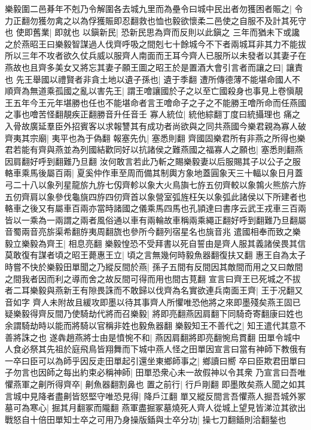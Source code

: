 樂毅圍二邑朞年不剋乃令解圍各去城九里而為壘令曰城中民出者勿獲困者賑之|{
	令力正翻勿獲勿禽之以為俘獲賑即忍翻救也恤也毅欲懷柔二邑使之自服不及計其死守也}
使即舊業|{
	即就也}
以鎭新民|{
	恐新民思為齊而反則以此鎭之}
三年而猶未下或讒之於燕昭王曰樂毅智謀過人伐齊呼吸之間剋七十餘城今不下者兩城耳非其力不能拔所以三年不攻者欲久仗兵威以服齊人南面而王耳今齊人已服所以未發者以其妻子在燕故也且齊多美女又將忘其妻子願王圖之昭王於是置酒大會引言者而讓之曰|{
	讓責也}
先王舉國以禮賢者非貪土地以遺子孫也|{
	遺于季翻}
遭所傳德薄不能堪命國人不順齊為無道乘孤國之亂以害先王|{
	謂王噲讓國於子之以至亡國殺身也事見上卷愼靚王五年今王元年堪勝也任也不能堪命者言王噲命子之子之不能勝王噲所命而任燕國之事也噲苦怪翻靚疾正翻勝音升任音壬}
寡人統位|{
	統他綜翻丁度曰統攝理也}
痛之入骨故廣延羣臣外招賓客以求報讐其有成功者尚欲與之同共燕國今樂君親為寡人破齊夷其宗廟|{
	夷平也為于偽翻}
報塞先仇|{
	塞悉則翻}
齊國固樂君所有非燕之所得也樂君若能有齊與燕並為列國結歡同好以抗諸侯之難燕國之福寡人之願也|{
	塞悉則翻燕因肩翻好呼到翻難乃旦翻}
汝何敢言若此乃斬之賜樂毅妻以后服賜其子以公子之服輅車乘馬後屬百兩|{
	夏奚仲作車至周而備其制輿方象地蓋圓象天三十輻以象日月蓋弓二十八以象列星龍旂九斿七仭齊軫以象大火鳥旟七斿五仞齊較以象鶉火熊旂六斿五仞齊肩以象參伐龜旐四斿四仞齊首以象營室弧旌枉矢以象弧此諸侯以下所建者也輅車之後又有屬車百兩亦當時諸國之儀乘馬四馬也孔頴達曰書序云武王戎車三百兩皆以一乘為一兩謂之兩者風俗通以車有兩輪故車稱兩乘繩正翻好呼到翻難乃旦翻屬音蜀兩音亮旂渠希翻斿夷周翻旒也參所今翻列宿星名也旐音兆}
遣國相奉而致之樂毅立樂毅為齊王|{
	相息亮翻}
樂毅惶恐不受拜書以死自誓由是齊人服其義諸侯畏其信莫敢復有謀者頃之昭王薨惠王立|{
	頃之言無幾何時毅魚器翻復扶又翻}
惠王自為太子時嘗不快於樂毅田單聞之乃縱反間於燕|{
	孫子五間有反間因其敵間而用之又曰敵間之間我者因而利之導而舍之故反間可得而用也間古莧翻}
宣言曰齊王已死城之不拔者二耳樂毅與燕新王有隙畏誅而不敢歸以伐齊為名實欲連兵南面王齊|{
	王于况翻又音如字}
齊人未附故且緩攻即墨以待其事齊人所懼唯恐他將之來即墨殘矣燕王固已疑樂毅得齊反間乃使騎劫代將而召樂毅|{
	將即亮翻燕因肩翻下同騎奇寄翻康曰姓也余謂騎劫時以能而將騎以官稱非姓也毅魚器翻}
樂毅知王不善代之|{
	知王遣代其意不善將誅之也}
遂犇趙燕將士由是憤惋不和|{
	燕因肩翻將即亮翻惋烏貫翻}
田單令城中人食必祭其先祖於庭飛鳥皆翔舞而下城中燕人怪之田單因宣言曰當有神師下教俄有一卒曰臣可以為師乎因反走田單起引還坐東鄉師事之|{
	鄉讀曰嚮}
卒曰臣欺君田單曰子勿言也因師之每出約束必稱神師|{
	田單恐衆心未一故假神以令其衆}
乃宣言曰吾唯懼燕軍之劓所得齊卒|{
	劓魚器翻割鼻也}
置之前行|{
	行戶剛翻}
即墨敗矣燕人聞之如其言城中見降者盡劓皆怒堅守唯恐見得|{
	降戶江翻}
單又縱反間言吾懼燕人掘吾城外冢墓可為寒心|{
	掘其月翻冢而隴翻}
燕軍盡掘冢墓燒死人齊人從城上望見皆涕泣其欲出戰怒自十倍田單知士卒之可用乃身操版鍤與士卒分功|{
	操七刀翻鍤則洽翻鍫也}
